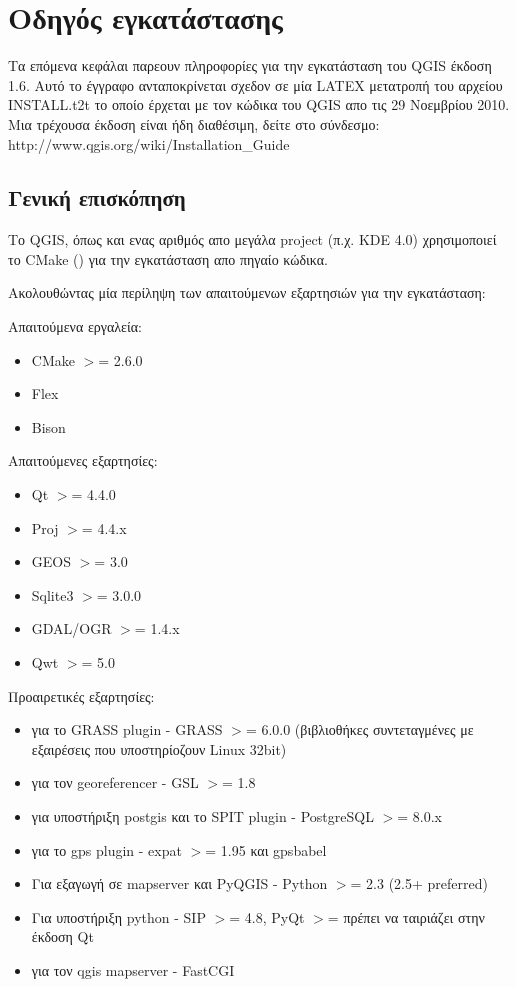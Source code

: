 

\section{Οδηγός εγκατάστασης}

Τα επόμενα κεφάλαι παρεουν πληροφορίες για την εγκατάσταση του QGIS έκδοση 1.6. Αυτό το έγγραφο ανταποκρίνεται σχεδον σε μία LATEX μετατροπή του αρχείου INSTALL.t2t το οποίο έρχεται με τον κώδικα του QGIS απο τις 29 Νοεμβρίου 2010.
Μια τρέχουσα έκδοση είναι ήδη διαθέσιμη, δείτε στο σύνδεσμο: http://www.qgis.org/wiki/Installation\_Guide

\hypertarget{toc2}{}
\subsection{Γενική επισκόπηση}
Το QGIS, όπως και ενας αριθμός απο μεγάλα project (π.χ. KDE 4.0) χρησιμοποιεί το CMake
() για την εγκατάσταση απο πηγαίο κώδικα.

Ακολουθώντας μία περίληψη των απαιτούμενων εξαρτησιών για την εγκατάσταση:

Απαιτούμενα εργαλεία:

\begin{itemize}
\item CMake $>$= 2.6.0
\item Flex
\item Bison
\end{itemize}


Απαιτούμενες εξαρτησίες:

\begin{itemize}
\item Qt $>$= 4.4.0
\item Proj $>$= 4.4.x
\item GEOS $>$= 3.0
\item Sqlite3 $>$= 3.0.0
\item GDAL/OGR $>$= 1.4.x
\item Qwt $>$= 5.0
\end{itemize}


Προαιρετικές εξαρτησίες:

\begin{itemize}
\item για το GRASS plugin - GRASS $>$= 6.0.0 (βιβλιοθήκες συντεταγμένες με εξαιρέσεις που υποστηρίοζουν Linux 32bit)
\item για τον georeferencer - GSL $>$= 1.8
\item για υποστήριξη postgis και το SPIT plugin - PostgreSQL $>$= 8.0.x
\item για το gps plugin - expat $>$= 1.95 και gpsbabel
\item Για εξαγωγή σε mapserver και PyQGIS - Python $>$= 2.3 (2.5+ preferred)
\item Για υποστήριξη python - SIP $>$= 4.8, PyQt $>$= πρέπει να ταιριάζει στην έκδοση Qt
\item για τον qgis mapserver - FastCGI
\end{itemize}




